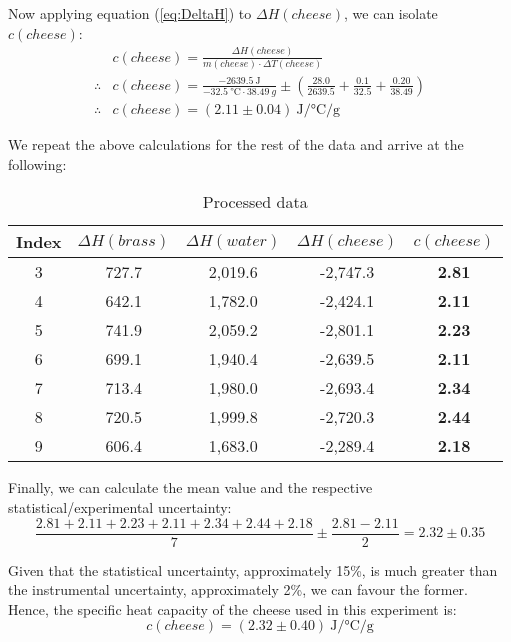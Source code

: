 Now applying equation (\ref{eq:DeltaH}) to $\Delta H(cheese)$, we can isolate $c(cheese)$:
\begin{equation}
\begin{split}
    &c(cheese) = \frac{\Delta H(cheese)}{m(cheese) \cdot \Delta T(cheese)} \\
    \therefore & c(cheese) = \frac{ \SI{-2639.5}{\joule} }{ \SI{-32.5}{\celsius} \cdot \SI{38.49}{g} } \pm (\frac{28.0}{2639.5} + \frac{0.1}{32.5} + \frac{0.20}{38.49})\\
    \therefore & c(cheese) = (2.11 \pm  0.04) \ \si{\joule\per\celsius\per\gram}
\end{split}
\end{equation}

We repeat the above calculations for the rest of the data and arrive at the following:

\begin{table}[h]
    \centering
\begin{tabular}{c|c|c|c|c}
    Index & $\Delta H(brass)$ & $\Delta H(water)$ & $\Delta H(cheese)$ & $c(cheese)$ \\ \hline
    3    &    727.7 &   2,019.6  &	-2,747.3 & \textbf{2.81} \\
    4    &    642.1 &   1,782.0  &	-2,424.1 & \textbf{2.11} \\
    5    &    741.9 &   2,059.2  &	-2,801.1 & \textbf{2.23} \\
    6    &    699.1 &   1,940.4  &	-2,639.5 & \textbf{2.11} \\
    7    &    713.4 &   1,980.0  &	-2,693.4 & \textbf{2.34} \\
    8    &    720.5 &   1,999.8  &	-2,720.3 & \textbf{2.44} \\
    9    &    606.4 &   1,683.0  &	-2,289.4 & \textbf{2.18} \\


\end{tabular}
    \caption{Processed data}
\end{table}

Finally, we can calculate the mean value and the respective statistical/experimental uncertainty:
\begin{equation}
	\frac{2.81+2.11+2.23+2.11+2.34+2.44+2.18}{7} \pm \frac{2.81 - 2.11}{2}= 2.32 \pm 0.35
\end{equation}

Given that the statistical uncertainty, approximately 15\%, is much greater than the instrumental uncertainty, approximately 2\%, we can favour the former. Hence, the specific heat capacity of the cheese used in this experiment is:
\[
	c(cheese) = (2.32 \pm 0.40) \ \si{\joule\per\celsius\per\gram}
\]
